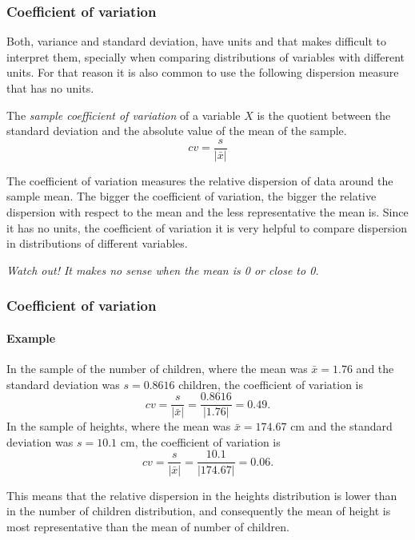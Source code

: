 \begin{frame}
\frametitle{Coefficient of variation}
Both, variance and standard deviation, have units and that makes difficult to interpret them, specially when comparing distributions of variables with different units.
For that reason it is also common to use the following dispersion measure that has no units.  

\begin{definition}
The \emph{sample coefficient of variation} of a variable $X$ is the quotient between the standard deviation and the absolute value of the mean of the sample.
\[
cv = \frac{s}{|\bar x|}
\]
\end{definition}

The coefficient of variation measures the relative dispersion of data around the sample mean.  
The bigger the coefficient of variation, the bigger the relative dispersion with respect to the mean and the less representative the mean is.
Since it has no units, the coefficient of variation it is very helpful to compare dispersion in distributions of different variables.

\begin{center}
\alert{\emph{Watch out! It makes no sense when the mean is 0 or close to 0.}}
\end{center}
\end{frame}


\begin{frame}
\frametitle{Coefficient of variation}
\framesubtitle{Example}
In the sample of the number of children, where the mean was $\bar x=1.76$ and the standard deviation was $s=0.8616$
children, the coefficient of variation is
\[
cv = \frac{s}{|\bar x|} = \frac{0.8616}{|1.76|} = 0.49.
\]
In the sample of heights, where the mean was $\bar x=174.67$ cm and the standard deviation was $s=10.1$ cm, the
coefficient of variation is
\[
cv = \frac{s}{|\bar x|} = \frac{10.1}{|174.67|} = 0.06.
\]

This means that the relative dispersion in the heights distribution is lower than in the number of children
distribution, and consequently the mean of height is most representative than the mean of number of children.
\end{frame}


